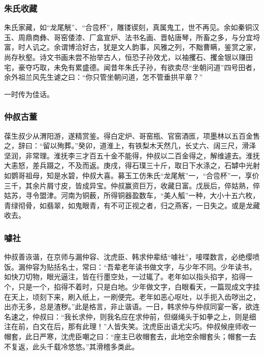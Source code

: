 \documentclass[]{article}
\begin{document}
\hypertarget{header-n474}{%
\subsubsection{朱氏收藏}\label{header-n474}}

朱氏家藏，如``龙尾觥''、``合卺杯''，雕镂锲刻，真属鬼工，世不再见。余如秦铜汉玉、周鼎商彝、哥窑倭漆、厂盒宣炉、法书名画、晋帖唐琴，所畜之多，与分宜埒富，时人讥之。余谓博洽好古，犹是文人韵事，风雅之列，不黜曹瞒，鉴赏之家，尚存秋壑。诗文书画未尝不抬举古人，恒恐子孙效尤，以袖攫石、攫金银以赚田宅，豪夺巧取，未免有累盛德。闻昔年朱氏子孙，有欲卖尽``坐朝问道''四号田者，余外祖兰风先生谑之曰：``你只管坐朝问道，怎不管垂拱平章？''

一时传为佳话。

\hypertarget{header-n479}{%
\subsubsection{仲叔古董}\label{header-n479}}

葆生叔少从渭阳游，遂精赏鉴。得白定炉、哥窑瓶、官窑酒匜，项墨林以五百金售之，辞曰：``留以殉葬。''癸卯，道淮上，有铁梨木天然几，长丈六、阔三尺，滑泽坚润，非常理。淮抚李三才百五十金不能得，仲叔以二百金得之，解维遽去。淮抚大恚怒，差兵蹑之，不及而返。庚戌，得石璞三十斤，取日下水涤之，石罅中光射如鹦哥祖母，知是水碧，仲叔大喜。募玉工仿朱氏``龙尾觥''一，``合卺杯''一，享价三千，其余片屑寸皮，皆成异宝。仲叔赢资巨万，收藏日富。戊辰后，倅姑熟，倅姑苏，寻令盟津。河南为铜薮，所得铜器盈数车，``美人觚''一种，大小十五六枚，青绿彻骨，如翡翠，如鬼眼青，有不可正视之者，归之燕客，一日失之。或是龙藏收去。

\hypertarget{header-n484}{%
\subsubsection{噱社}\label{header-n484}}

仲叔善诙谐，在京师与漏仲容、沈虎臣、韩求仲辈结``噱社''，唼喋数言，必绝缨喷饭。漏仲容为贴括名士，常曰：``吾辈老年读书做文字，与少年不同。少年读书，如快刀切物，眼光逼注，皆在行墨空处，一过辄了。老年如以指头掐字，掐得一个，只是一个，掐得不着时，只是白地。少年做文字，白眼看天，一篇现成文字挂在天上，顷刻下来，刷入纸上，一刷便完。老年如恶心呕吐，以手扼入齿哕出之，出亦无多，总是渣秽。''此是格言，非止谐语。一日，韩求仲与仲叔同宴一客，欲连名速之，仲叔曰：``我长求仲，则我名应在求仲前，但缀绳头于如拳之上，则是细注在前，白文在后，那有此理！''人皆失笑。沈虎臣出语尤尖巧。仲叔候座师收一帽套，此日严寒，沈虎臣嘲之曰：``座主已收帽套去，此地空余帽套头；帽套一去不复返，此头千载冷悠悠。''其滑稽多类此。
\end{document}
